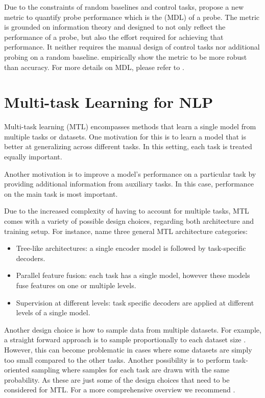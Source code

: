 Due to the constraints of random baselines and control tasks, \citep{voita-titov-2020-information} propose a new metric to quantify probe performance which is the  (MDL) of a probe. The metric is grounded on information theory \citep{shannon1948mathematical} and designed to not only reflect the performance of a probe, but also the effort required for achieving that performance. It neither requires the manual design of control tasks nor additional probing on a random baseline. \citep{voita-titov-2020-information} empirically show the metric to be more robust than accuracy. For more details on MDL, please refer to .

\section{Multi-task Learning for NLP}
Multi-task learning (MTL) encompasses methods that learn a single model from multiple tasks or datasets. One motivation for this is to learn a model that is better at generalizing across different tasks. In this setting, each task is treated equally important.

Another motivation is to improve a model's performance on a particular task by providing additional information from auxiliary tasks. In this case, performance on the main task is most important.

Due to the increased complexity of having to account for multiple tasks, MTL comes with a variety of possible design choices, regarding both architecture and training setup. For instance, \citet{DBLP:journals/corr/abs-2109-09138} name three general MTL architecture categories:
\begin{itemize}
    \item Tree-like architectures: a single encoder model is followed by task-specific decoders.
    \item Parallel feature fusion: each task has a single model, however these models fuse features on one or multiple levels.
    \item Supervision at different levels: task specific decoders are applied at different levels of a single model.
\end{itemize}
Another design choice is how to sample data from multiple datasets. For example, a straight forward approach is to sample proportionally to each dataset size \citep{DBLP:journals/corr/abs-1811-06031}. However, this can become problematic in cases where some datasets are simply too small compared to the other tasks. Another possibility is to perform task-oriented sampling \citep{DBLP:journals/corr/ZhangXWJ17} where samples for each task are drawn with the same probability. As these are just some of the design choices that need to be considered for MTL. For a more comprehensive overview we recommend \citep{DBLP:journals/corr/abs-2109-09138, DBLP:journals/corr/abs-2007-16008}.

